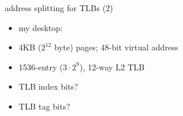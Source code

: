 
\begin{frame}{address splitting for TLBs (2)}
\begin{itemize}
\item my desktop:
\item 4KB ($2^{12}$ byte) pages; 48-bit virtual address
\item 1536-entry ($3\cdot 2^9$), 12-way L2 TLB
\vspace{.5cm}
\item TLB index bits?
\iftoggle{heldback}{}{
    \begin{itemize}\item<2->$1536/12 = 128$ sets --- 7 bits\end{itemize}
}
\item TLB tag bits?
\iftoggle{heldback}{}{
    \begin{itemize}\item<2->$48-12=36$ bit virtual page number ---  $36-7=29$ bit TLB tag\end{itemize}
}
\end{itemize}
\end{frame}

